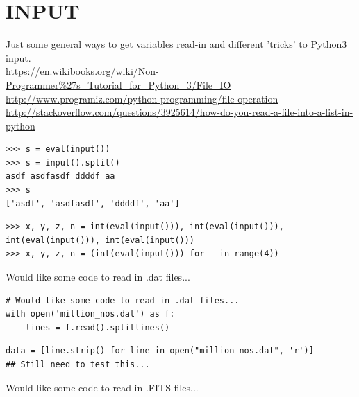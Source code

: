 \documentclass[11pt,a4paper]{article}
\begin{document}
\section{INPUT}
Just some general ways to get variables read-in and different 'tricks' to Python3 input. \\
\href{https://en.wikibooks.org/wiki/Non-Programmer\%27s\_Tutorial\_for\_Python\_3/File\_IO}{https://en.wikibooks.org/wiki/Non-Programmer\%27s\_Tutorial\_for\_Python\_3/File\_IO}\\
\href{http://www.programiz.com/python-programming/file-operation}{http://www.programiz.com/python-programming/file-operation}\\
\href{http://stackoverflow.com/questions/3925614/how-do-you-read-a-file-into-a-list-in-python}{http://stackoverflow.com/questions/3925614/how-do-you-read-a-file-into-a-list-in-python}\\


\begin{lstlisting}
>>> s = eval(input())
>>> s = input().split()
asdf asdfasdf ddddf aa
>>> s
['asdf', 'asdfasdf', 'ddddf', 'aa']
\end{lstlisting}

\begin{lstlisting}
>>> x, y, z, n = int(eval(input())), int(eval(input())), int(eval(input())), int(eval(input()))
>>> x, y, z, n = (int(eval(input())) for _ in range(4))
\end{lstlisting}

Would like some code to read in .dat files...
\begin{lstlisting}
# Would like some code to read in .dat files...
with open('million_nos.dat') as f:
    lines = f.read().splitlines()
\end{lstlisting}

\begin{lstlisting}
data = [line.strip() for line in open("million_nos.dat", 'r')]
## Still need to test this...
\end{lstlisting}


\smallskip
\smallskip
\noindent 
Would like some code to read in .FITS files...
\begin{lstlisting}
\end{lstlisting}
\end{document}
